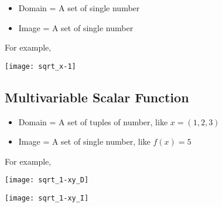 \documentclass[class=article, crop=false, 12pt]{standalone}
\begin{document}
\begin{itemize}
    \item Domain = A set of single number
    \item Image = A set of single number 
\end{itemize}

For example, 

\begin{center}
    \texttt{[image: sqrt\_x-1]}
\end{center}


\subsection{Multivariable Scalar Function}

\begin{itemize}
    \item Domain = A set of tuples of number, like $x = (1,2,3)$
    \item Image = A set of single number, like $f(x) = 5$
\end{itemize}

For example,

\begin{center}
    \begin{minipage}{0.15\textwidth}
    \end{minipage}
    \begin{minipage}{0.3\textwidth}
        \texttt{[image: sqrt\_1-xy\_D]}
    \end{minipage}
    \green{$\xrightarrow{\hspace{0.2\textwidth}}$}
    \begin{minipage}{0.22\textwidth}
        \centering
        \texttt{[image: sqrt\_1-xy\_I]}
    \end{minipage}
\end{center}
\end{document}
